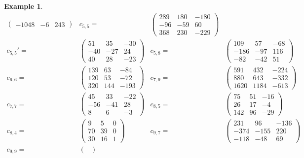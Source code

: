 \documentclass[10pt, preprint]{elsarticle}
\theoremstyle{definition}
\newtheorem{example}[theorem]{Example}
\theoremstyle{definition}
\begin{document}
\begin{example}
{\begin{align*}
\begin{pmatrix}
-1048 & -6 & 243
\end{pmatrix}
& c_{5,5}=& \begin{pmatrix}
289 & 180 & -180 \\
-96 & -59 & 60 \\
368 & 230 & -229
\end{pmatrix}
\\
c_{5,5}'=&\begin{pmatrix}
51 & 35 & -30 \\
-40 & -27 & 24 \\
40 & 28 & -23
\end{pmatrix}
& c_{5,8}=&\begin{pmatrix}
109 & 57 & -68 \\
-186 & -97 & 116 \\
-82 & -42 & 51
\end{pmatrix}
\\
c_{6,6}=&\begin{pmatrix}
139 & 63 & -84 \\
120 & 53 & -72 \\
320 & 144 & -193
\end{pmatrix}
& c_{7,9}=&\begin{pmatrix}
591 & 432 & -224 \\
880 & 643 & -332 \\
1620 & 1184 & -613
\end{pmatrix}
\\
c_{7,7}=&\begin{pmatrix}
45 & 33 & -22 \\
-56 & -41 & 28 \\
8 & 6 & -3
\end{pmatrix}
& c_{8,5}=&\begin{pmatrix}
75 & 51 & -16 \\
26 & 17 & -4 \\
142 & 96 & -29
\end{pmatrix}
\\
c_{8,4}=&\begin{pmatrix}
9 & 5 & 0 \\
70 & 39 & 0 \\
30 & 16 & 1
\end{pmatrix}
& c_{9,7}=&\begin{pmatrix}
231 & 96 & -136 \\
-374 & -155 & 220 \\
-118 & -48 & 69
\end{pmatrix}
\\
c_{9,9}=&\begin{pmatrix}

\end{pmatrix}
\end{align*}}
\end{example}
\end{document}
